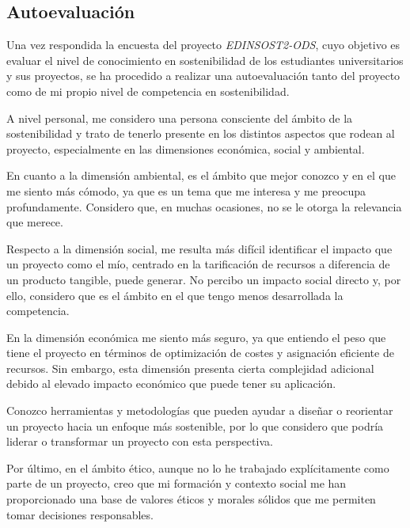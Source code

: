 \subsection{Autoevaluación}

Una vez respondida la encuesta del proyecto \textit{EDINSOST2-ODS}, cuyo objetivo es evaluar 
el nivel de conocimiento en sostenibilidad de los estudiantes universitarios y sus proyectos, 
se ha procedido a realizar una autoevaluación tanto del proyecto como de mi propio nivel de 
competencia en sostenibilidad.

A nivel personal, me considero una persona consciente del ámbito de la sostenibilidad y trato 
de tenerlo presente en los distintos aspectos que rodean al proyecto, especialmente en las 
dimensiones económica, social y ambiental.

En cuanto a la dimensión ambiental, es el ámbito que mejor conozco y en el que me siento más 
cómodo, ya que es un tema que me interesa y me preocupa profundamente. Considero que, en muchas 
ocasiones, no se le otorga la relevancia que merece.

Respecto a la dimensión social, me resulta más difícil identificar el impacto que un proyecto 
como el mío, centrado en la tarificación de recursos a diferencia de un producto tangible, puede 
generar. No percibo un impacto social directo y, por ello, considero que es el ámbito en el 
que tengo menos desarrollada la competencia.

En la dimensión económica me siento más seguro, ya que entiendo el peso que tiene el proyecto 
en términos de optimización de costes y asignación eficiente de recursos. Sin embargo, esta 
dimensión presenta cierta complejidad adicional debido al elevado impacto económico que puede 
tener su aplicación.

Conozco herramientas y metodologías que pueden ayudar a diseñar o reorientar un proyecto hacia 
un enfoque más sostenible, por lo que considero que podría liderar o transformar un proyecto 
con esta perspectiva.

Por último, en el ámbito ético, aunque no lo he trabajado explícitamente como parte de un 
proyecto, creo que mi formación y contexto social me han proporcionado una base de valores 
éticos y morales sólidos que me permiten tomar decisiones responsables.